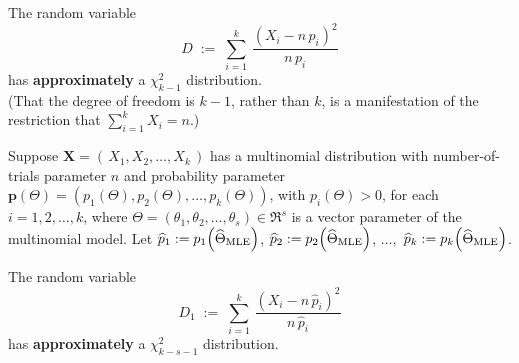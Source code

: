\documentclass{article}
\begin{document}
\begin{theorem}\quad
The random variable
\begin{equation*}
   D \; := \;
   \sum^{k}_{i=1}\, \dfrac{(X_{i}-n\,p_{i})^{2}}{n\,p_{i}}
\end{equation*}
has \textbf{approximately} a $\chi^{2}_{k-1}$ distribution.\\
(That the degree of freedom is $k-1$, rather than $k$, is a manifestation of the restriction that $\sum_{i=1}^{k}X_{i} = n$.)
\end{theorem}

Suppose $\mathbf{X} = \left(\,X_{1},X_{2},\ldots,X_{k}\,\right)$ has a multinomial distribution with number-of-trials parameter $n$ and probability parameter $\mathbf{p}(\Theta) = (p_{1}(\Theta),p_{2}(\Theta),\ldots,p_{k}(\Theta))$, with $p_{i}(\Theta)>0$, for each $i=1,2,\ldots,k$, where $\Theta = (\theta_{1},\theta_{2},\ldots,\theta_{s}) \in \Re^{s}$ is a vector parameter of the multinomial model.
Let $\widehat{p}_{1}:= p_{1}\!\left(\widehat{\Theta}_{\textnormal{MLE}}\right)$, $\widehat{p}_{2}:= p_{2}\!\left(\widehat{\Theta}_{\textnormal{MLE}}\right)$, $\ldots,$ $\widehat{p}_{k}:= p_{k}\!\left(\widehat{\Theta}_{\textnormal{MLE}}\right)$.

\begin{theorem}\quad
The random variable
\begin{equation*}
   D_{1} \; := \;
   \sum^{k}_{i=1}\, \dfrac{(X_{i}-n\,\widehat{p}_{i})^{2}}{n\,\widehat{p}_{i}}
\end{equation*}
has \textbf{approximately} a $\chi^{2}_{k-s-1}$ distribution.
\end{theorem}



\appendix



%
%
%



\end{document}
